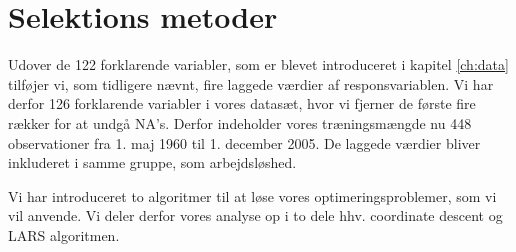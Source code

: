 \chapter{Selektions metoder}
Udover de 122 forklarende variabler, som er blevet introduceret i kapitel \ref{ch:data} tilføjer vi, som tidligere nævnt, fire laggede værdier af responsvariablen.  
Vi har derfor 126 forklarende variabler i vores datasæt, hvor vi fjerner de første fire rækker for at undgå NA's. 
Derfor indeholder vores træningsmængde nu 448 observationer fra 1. maj 1960 til 1. december 2005. 
De laggede værdier bliver inkluderet i samme gruppe, som arbejdsløshed. 

Vi har introduceret to algoritmer til at løse vores optimeringsproblemer, som vi vil anvende.
Vi deler derfor vores analyse op i to dele  hhv. coordinate descent og LARS algoritmen.






%
